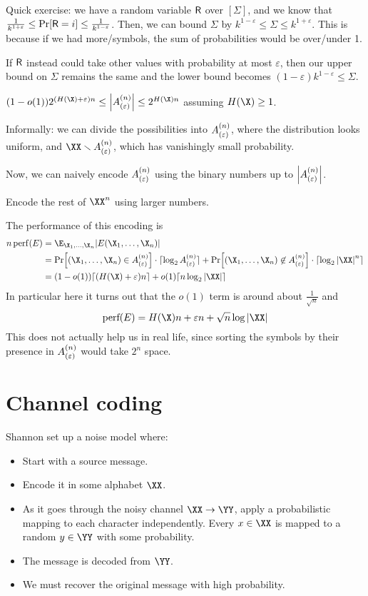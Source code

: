 \documentclass[class=co432,notes,tikz]{agony}
\begin{document}
Quick exercise: we have a random variable $\mathsf R$ over $[\Sigma]$,
and we know that $\frac{1}{k^{1+\varepsilon}} \leq \Pr[\mathsf R=i] \leq \frac{1}{k^{1-\varepsilon}}$.
Then, we can bound $\Sigma$ by $k^{1-\varepsilon} \leq \Sigma \leq k^{1+\varepsilon}$.
This is because if we had more/symbols, the sum of probabilities would be over/under 1.

If $\mathsf R$ instead could take other values with probability at most $\varepsilon$,
then our upper bound on $\Sigma$ remains the same and the lower bound
becomes $(1-\varepsilon)k^{1-\varepsilon} \leq \Sigma$.

\begin{claim}
  $(1-o(1))2^{(H(\X)+\varepsilon)n} \leq \abs{\aeps} \leq 2^{H(\X)n}$
  assuming $H(\X) \geq 1$.
\end{claim}
Informally: we can divide the possibilities into $A_{(\varepsilon)}^{(n)}$,
where the distribution looks uniform, and $\XX \setminus \aeps$,
which has vanishingly small probability.

Now, we can naively encode $A_{(\varepsilon)}^{(n)}$ using the binary numbers up to $\abs{A_{(\varepsilon)}^{(n)}}$.

Encode the rest of $\XX^n$ using larger numbers.

The performance of this encoding is
\begin{align*}
  n\operatorname{perf}(E) & = \E_{\X_1,\dotsc,\X_n} \abs{E(\X_1,\dotsc,\X_n)}                             \\
                          & = \Pr[(\X_1,\dotsc,\X_n) \in \aeps]\cdot\ceil{\log_2 A^{(n)}_{(\varepsilon)}}
  + \Pr[(\X_1,\dotsc,\X_n) \not\in \aeps]\cdot\ceil{\log_2 \abs{\XX}^n}                                   \\
                          & = (1-o(1))\ceil{(H(\X)+\varepsilon)n} + o(1)\ceil{n\log_2\abs{\XX}}
\end{align*}
In particular here it turns out that the $o(1)$ term is around about $\frac{1}{\sqrt{n}}$ and
\[ \text{perf}(E) = H(\X)n + \varepsilon n + \sqrt{n}\log\abs{\XX} \]
This does not actually help us in real life,
since sorting the symbols by their presence in $A_{(\varepsilon)}^{(n)}$
would take $2^n$ space.

\section{Channel coding}

Shannon set up a noise model where:
\begin{itemize}[nosep]
  \item Start with a source message.
  \item Encode it in some alphabet $\XX$.
  \item As it goes through the noisy channel $\XX \to \YY$,
        apply a probabilistic mapping to each character independently.
        Every $x \in \XX$ is mapped to a random $y \in\YY$ with some probability.
  \item The message is decoded from $\YY$.
  \item We must recover the original message with high probability.
\end{itemize}
\end{document}
